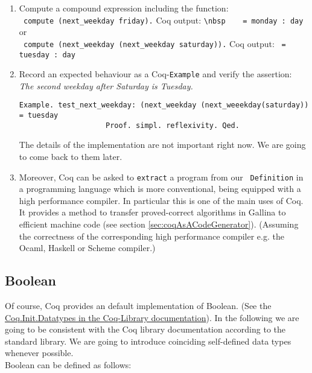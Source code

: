 	   \begin{enumerate}
	   \item Compute a compound expression including the function:\\ 		
	 		 \lstinline! compute (next_weekday friday).! Coq output: \lstinline!\nbsp	 = monday : day ! or \\
	 		 \lstinline! compute (next_weekday (next_weekday saturday)).! Coq output: \lstinline! = tuesday : day !\\ 	      
	   \item Record an expected behaviour as a Coq-\lstinline!Example! and verify the assertion:\\ 
	         {\itshape The second weekday after Saturday is Tuesday.}     
			   \begin{lstlisting}[caption = {\lstinline!text_next_weekday!}, label = lst:next_weekday]
			   		Example. test_next_weekday: (next_weekday (next_weeekday(saturday)) = tuesday 
			   		Proof. simpl. reflexivity. Qed.
			   \end{lstlisting}
	   			The details of the implementation are not important right now. 
	   			We are going to come back to them later.
	   
	   \item \label{CoqAsCodeGen} Moreover, Coq can be asked to \lstinline!extract! a program from our \lstinline! Definition! in a programming language which is more conventional, being equipped with a high performance compiler.
	    In particular this is one of the main uses of Coq. 
	    It provides a method to transfer proved-correct algorithms in Gallina to efficient machine code (see section \ref{sec:coqAsACodeGenerator}).
	    (Assuming the correctness of the corresponding high performance compiler e.g. the Ocaml, Haskell or Scheme compiler.) 			
	   \end{enumerate}   
	
	\subsection{Boolean}
	\label{subsec:boolean}
	
	    Of course, Coq provides an default implementation of Boolean.
	    (See the \newline \href{https://www.cs.princeton.edu/courses/archive/fall07/cos595/stdlib/html/Coq.Init.Datatypes.html}{Coq.Init.Datatypes \allowbreak in the Coq-Library documentation}).  
	    In the following we are going to be consistent with the Coq library documentation according to the standard library.
	    We are going to introduce coinciding self-defined data types whenever possible.\\
	    Boolean can be defined as follows:
	    
